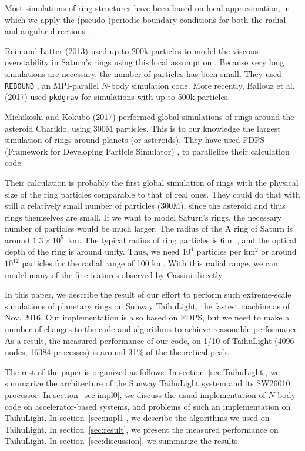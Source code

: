 \documentclass[oribibl]{llncs}
\begin{document}
Most simulations of ring structures have been based on local
approximation, in which we apply the (pseudo-)periodic boundary
conditions for both the radial and angular
directions \cite{1988AJ.....95..925W}.

Rein and Latter (2013) used up to 200k particles to model the viscous
overstability in Saturn's rings using this local assumption
\cite{2013MNRAS.431..145R}. Because very long simulations are
necessary, the number of particles has been small. They used {\tt
  REBOUND} \cite{2012A&A...537A.128R}, an MPI-parallel $N$-body
simulation code. More recently, Ballouz et al. (2017)
\cite{2017AJ....153..146B} used {\tt pkdgrav}
\cite{2001PhDT........21S} for simulations with up to 500k particles.


Michikoshi and Kokubo (2017) \cite{2017ApJ...837L..13M} performed
global simulations of rings around the asteroid Chariklo, using 300M
particles. This is to our knowledge the largest simulation of rings
around planets (or asteroids).  They have used FDPS (Framework for
Developing Particle Simulator) \cite{2016PASJ...68...54I}, to
parallelize their calculation code.

Their calculation is probably the first global simulation of rings
with the physical size of the ring particles comparable to that of real
ones. They could do that with still a relatively small number of
particles (300M), since the asteroid and thus rings themselves are
small. If we want to model Saturn's rings, the necessary number of
particles would be much larger. The radius of the A ring of Saturn is
around $1.3\times 10^5$~km. The typical radius of ring particles is
6 m \cite{1985Icar...64..531Z}, and the optical depth of the ring is
around unity. Thus, we need $10^4$ particles per km$^2$ or around
$10^{12}$ particles for the radial range of 100 km. With this radial
range, we can model many of the fine features observed by Cassini
directly.

In this paper, we describe the result of our effort to perform such
extreme-scale simulations of planetary rings on Sunway TaihuLight, the
fastest machine as of Nov. 2016. Our implementation is also based on
FDPS, but we need to make a number of changes to the code and
algorithms to achieve reasonable performance. As a result, the
measured performance of our code, on 1/10 of TaihuLight (4096 nodes,
16384 processes) is around 31\% of the theoretical peak.

The rest of the paper is organized as follows. In
section~\ref{sec:TaihuLight}, we summarize the architecture of the Sunway
TaihuLight system and its SW26010 processor. In
section~\ref{sec:impl0}, we discuss the usual implementation of
$N$-body code on accelerator-based systems, and problems of such
an implementation on TaihuLight. In section~\ref{sec:impl1}, we describe
the algorithms we used on TaihuLight. In section~\ref{sec:result}, we
present the measured performance on TaihuLight. In
section~\ref{sec:discussion}, we summarize the results.
\end{document}
